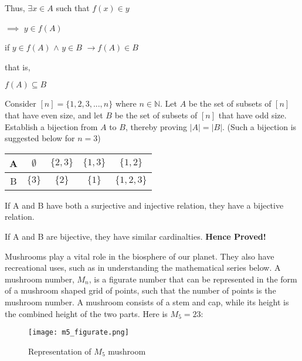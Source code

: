 \documentclass[addpoints]{exam}
\begin{document}
\begin{questions}
\begin{solution}
    Thus,
    $ \exists x \in A $ such that $f(x) \in y $
    
    $\implies$ $y \in f(A)$
    
    if $y \in f(A)$ $\wedge$ $y \in B$ $\rightarrow f(A) \in B$
    
    that is,
    
    $f(A) \subseteq B$
    
    
    
    
    
    
  \end{solution}

\question[15] Consider $[n] = \{1,2,3,...,n\}$ where $n \in \mathbb{N}$. Let $A$ be the set of subsets of $[n]$ that have even size, and let $B$ be the set of subsets of $[n]$ that have odd size. Establish a bijection from $A$ to $B$, thereby proving $|A| = |B|$. (Such a bijection is suggested below for $n = 3$) 

\begin{center}

  \begin{tabular}{ |c || c | c | c |c |}
    \hline
 A & $\emptyset$ & $\{2,3\}$ & $\{1,3\}$ & $\{1,2\}$ \\ \hline
 B & $\{3\}$ & $\{2\}$ & $\{1\}$ & $\{1,2,3\}$\\\hline
\end{tabular}
\end{center}

  \begin{solution}
    If A and B have both a surjective and injective relation, they have a bijective relation.
    
    If A and B are bijective, they have similar cardinalties.
    \textbf{Hence Proved!}
    
    
  \end{solution}
  
\question Mushrooms play a vital role in the biosphere of our planet. They also have recreational uses, such as in understanding the mathematical series below. A mushroom number, $M_n$, is a figurate number that can be represented in the form of a mushroom shaped grid of points, such that the number of points is the mushroom number. A mushroom consists of a stem and cap, while its height is the combined height of the two parts. Here is $M_5=23$:

\begin{figure}[h]
  \centering
  \texttt{[image: m5\_figurate.png]}
  \caption{Representation of $M_5$ mushroom}
  \label{fig:mushroom_anatomy}
\end{figure}


\end{questions}
\end{document}
